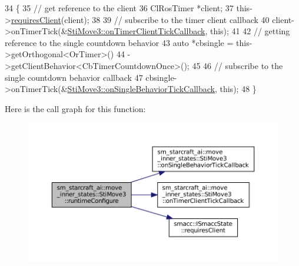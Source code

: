 \begin{DoxyCode}
34   \{
35     \textcolor{comment}{// get reference to the client}
36     ClRosTimer *client;
37     this->\hyperlink{classsmacc_1_1ISmaccState_a7f95c9f0a6ea2d6f18d1aec0519de4ac}{requiresClient}(client);
38 
39     \textcolor{comment}{// subscribe to the timer client callback}
40     client->onTimerTick(&\hyperlink{structsm__starcraft__ai_1_1move__inner__states_1_1StiMove3_aae9ba9faf3d05bfb5353a6569a895b31}{StiMove3::onTimerClientTickCallback}, \textcolor{keyword}{this});
41 
42     \textcolor{comment}{// getting reference to the single countdown behavior}
43     \textcolor{keyword}{auto} *cbsingle = this->getOrthogonal<OrTimer>()
44                           ->getClientBehavior<CbTimerCountdownOnce>();
45 
46     \textcolor{comment}{// subscribe to the single countdown behavior callback}
47     cbsingle->onTimerTick(&\hyperlink{structsm__starcraft__ai_1_1move__inner__states_1_1StiMove3_aa14b967f2718e5a6685966c8af317c93}{StiMove3::onSingleBehaviorTickCallback}, \textcolor{keyword}{
      this});
48   \}
\end{DoxyCode}
Here is the call graph for this function\+:
\nopagebreak
\begin{figure}[H]
\begin{center}
\leavevmode
\includegraphics[width=350pt]{structsm__starcraft__ai_1_1move__inner__states_1_1StiMove3_ad32f89ed6e3b623f544aa84760247a21_cgraph}
\end{center}
\end{figure}
\mbox{\label{structsm__starcraft__ai_1_1move__inner__states_1_1StiMove3_a40a677f56bfc7db23de87d05ef8f39bf}} 
